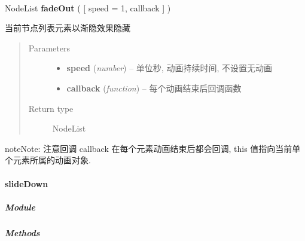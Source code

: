 \documentclass[letterpaper,10pt,english]{sphinxmanual}
\begin{document}
\begin{fulllineitems}
\label{api/core/node/fadeOut:Node.fadeOut}~
\begin{DUlineblock}{0em}
\item[] NodeList \textbf{fadeOut} ( {[} speed = 1, callback {]} )
\item[] 当前节点列表元素以渐隐效果隐藏
\end{DUlineblock}
\begin{quote}\begin{description}
\item[{Parameters}] \leavevmode\begin{itemize}
\item {}
\textbf{speed} (\emph{number}) -- 单位秒, 动画持续时间, 不设置无动画

\item {}
\textbf{callback} (\emph{function}) -- 每个动画结束后回调函数

\end{itemize}

\item[{Return type}] \leavevmode
NodeList

\end{description}\end{quote}

\begin{notice}{note}{Note:}
注意回调 callback 在每个元素动画结束后都会回调,  this 值指向当前单个元素所属的动画对象.
\end{notice}

\end{fulllineitems}



\paragraph{slideDown}
\label{api/core/node/slideDown::doc}\label{api/core/node/slideDown:slidedown}

\subparagraph{Module}
\label{api/core/node/slideDown:module}\begin{quote}

{\hyperref[api/core/node/index:module-Node]{}}
\end{quote}


\subparagraph{Methods}
\label{api/core/node/slideDown:methods}
\end{document}
